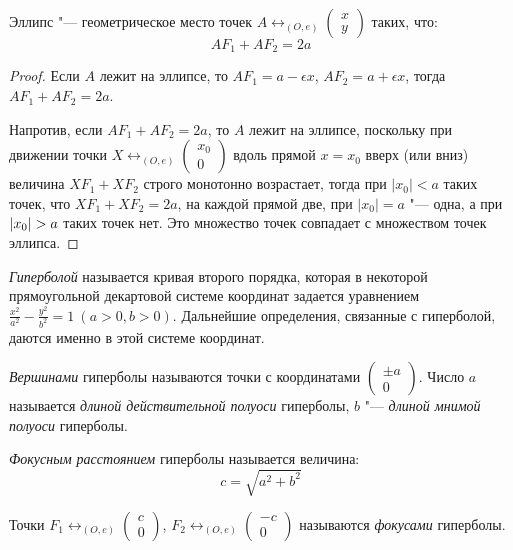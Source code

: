 \begin{theorem}
	Эллипс "--- геометрическое место точек $A \leftrightarrow_{(O, e)} \begin{pmatrix}x\\y\end{pmatrix}$ таких, что:
	\[AF_1 + AF_2 = 2a\]
\end{theorem}

\begin{proof}
	Если $A$ лежит на эллипсе, то $AF_1 = a - \epsilon x$, $AF_2 = a + \epsilon x$, тогда $AF_1 + AF_2 = 2a$.
	
	Напротив, если $AF_1 + AF_2 = 2a$, то $A$ лежит на эллипсе, поскольку при движении точки $X \leftrightarrow_{(O, e)} \begin{pmatrix}x_0\\0\end{pmatrix}$ вдоль прямой $x = x_0$ вверх (или вниз) величина $XF_1 + XF_2$ строго монотонно возрастает, тогда при $|x_0| < a$ таких точек, что $XF_1 + XF_2 = 2a$, на каждой прямой две, при $|x_0| = a$ "--- одна, а при $|x_0| \hm{>} a$ таких точек нет. Это множество точек совпадает с множеством точек эллипса.
\end{proof}

\begin{definition}
	\textit{Гиперболой} называется кривая второго порядка, которая в некоторой прямоугольной декартовой системе координат задается уравнением $\frac{x^2}{a^2} - \frac{y^2}{b^2} = 1~(a > 0, b > 0)$. Дальнейшие определения, связанные с гиперболой, даются именно в этой системе координат.
\end{definition}

\begin{definition}
	\textit{Вершинами} гиперболы называются точки с координатами $\begin{pmatrix}\pm a\\0\end{pmatrix}$. Число $a$ называется \textit{длиной действительной полуоси} гиперболы, $b$ "--- \textit{длиной мнимой полуоси} гиперболы.
\end{definition}

\begin{definition}
	\textit{Фокусным расстоянием} гиперболы называется величина:
	\[c = \sqrt{a^2 + b^2}\]
	
	Точки $F_1 \leftrightarrow_{(O, e)} \begin{pmatrix}c\\0\end{pmatrix}$, $F_2 \leftrightarrow_{(O, e)} \begin{pmatrix}-c\\0\end{pmatrix}$ называются \textit{фокусами} гиперболы.
\end{definition}

